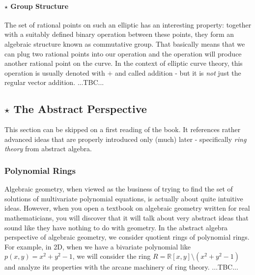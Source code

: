 \paragraph{$\star$ Group Structure} %
The set of rational points on such an elliptic has an interesting property: together with a suitably defined binary operation between these points, they form an algebraic structure known as commutative group. That basically means that we can plug two rational points into our operation and the operation will produce another rational point on the curve. In the context of elliptic curve theory, this operation is usually denoted  with $+$ and called addition - but it is \emph{not} just the regular vector addition. ...TBC...




\subsection{$\star$ The Abstract Perspective}
This section can be skipped on a first reading of the book. It references rather advanced ideas that are properly introduced only (much) later - specifically \emph{ring theory} from abstract algebra.




\subsubsection{Polynomial Rings}
Algebraic geometry, when viewed as the business of trying to find the set of solutions of multivariate polynomial equations, is actually about quite intuitive ideas. However, when you open a textbook on algebraic geometry written for real mathematicians, you will discover that it will talk about very abstract ideas that sound like they have nothing to do with geometry. In the abstract algebra perspective of algebraic geometry, we consider quotient rings of polynomial rings. For example, in 2D, when we have a bivariate polynomial like $p(x,y) = x^2 + y^2 - 1$, we will consider the ring $R = \mathbb{R}[x,y] \setminus (x^2 + y^2 - 1)$ and analyze its properties with the arcane machinery of ring theory. ...TBC...


